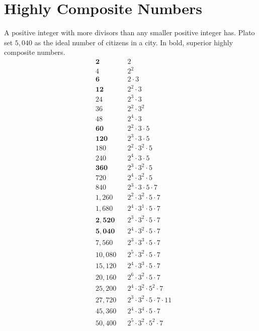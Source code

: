 \documentclass[12pt]{article}
\begin{document}
\section*{Highly Composite Numbers}
A positive integer with more divisors than any smaller positive integer has.  Plato set $5,040$ as the ideal number of citizens in a city. In bold, superior highly composite numbers.  
\begin{align*}
& \bm{2}       &&	2\\
& 4 	         && 2^{2}\\
& \bm{6}       && 2 \cdot 3\\
& \bm{12}      && 2^{2} \cdot 3\\
& 24 	         && 2^{3} \cdot 3 \\
& 36 	         && 2^{2} \cdot 3^{2} \\
& 48 	         && 2^{4} \cdot 3 \\
& \bm{60}	     && 2^{2} \cdot 3 \cdot 5\\
& \bm{120}     && 2^{3} \cdot 3 \cdot 5\\
& 180          && 2^{2} \cdot 3^{2} \cdot 5\\
& 240 	       && 2^{4} \cdot 3 \cdot 5\\
& \bm{360}     && 2^{3} \cdot 3^{2} \cdot 5\\
& 720 	       && 2^{4} \cdot 3^{2} \cdot 5\\
& 840 	       && 2^{3} \cdot 3 \cdot 5 \cdot 7\\
& 1,260 	     && 2^{2} \cdot 3^{2} \cdot 5 \cdot 7\\
& 1,680 	     && 2^{4} \cdot 3^{1} \cdot 5 \cdot 7\\
& \bm{2,520}   && 2^{3} \cdot 3^{2} \cdot 5 \cdot 7\\
& \bm{5,040}   && 2^{4} \cdot 3^{2} \cdot 5 \cdot 7\\
& 7,560 	     && 2^{3} \cdot 3^{3} \cdot 5 \cdot 7\\
& 10,080       && 2^{5} \cdot 3^{2} \cdot 5 \cdot 7\\
& 15,120	     && 2^{4} \cdot 3^{3} \cdot 5 \cdot 7\\
& 20,160	     && 2^{6} \cdot 3^{2} \cdot 5 \cdot 7\\
& 25,200	     && 2^{4} \cdot 3^{2} \cdot 5^{2} \cdot 7\\
& 27,720	     && 2^{3} \cdot 3^{2} \cdot 5 \cdot 7 \cdot 11\\
& 45,360	     && 2^{4} \cdot 3^{4} \cdot 5 \cdot 7\\
& 50,400	     && 2^{5} \cdot 3^{2} \cdot 5^{2} \cdot 7\\

\end{align*}
\end{document}
